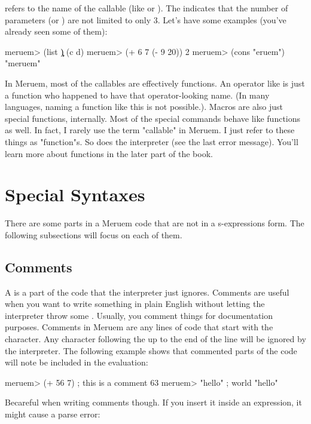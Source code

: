  refers to the name of the callable (like  or \code{++}). The  indicates that the number of parameters (or ) are not limited to only 3. Let's have some examples (you've already seen some of them):

\begin{REPL}
meruem> (list \c \d)
(c d)
meruem> (+ 6 7 (- 9 20))
2
meruem> (cons \m "eruem")
"meruem"
\end{REPL}

In Meruem, most of the callables are effectively functions. An operator like \code{+} is just a function who happened to have that operator-looking name. (In many languages, naming a function like this is not possible.). Macros are also just special functions, internally. Most of the special commands behave like functions as well. In fact, I rarely use the term "callable" in Meruem. I just refer to these things as "function"s. So does the interpreter (see the last error message). You'll learn more about functions in the later part of the book.

\section{Special Syntaxes}

There are some parts in a Meruem code that are not in a s-expressions form. The following subsections will focus on each of them.

\subsection{Comments}
A  is a part of the code that the interpreter just ignores. Comments are useful when you want to write something in plain English without letting the interpreter throw some . Usually, you comment things for documentation purposes. Comments in Meruem are any lines of code that start with the \code{;} character. Any character following the \code{;} up to the end of the line will be ignored by the interpreter. The following example shows that commented parts of the code will note be included in the evaluation:

\begin{REPL}
meruem> (+ 56 7) ; this is a comment
63
meruem> "hello" ; world
"hello"
\end{REPL}

Becareful when writing comments though. If you insert it inside an expression, it might cause a parse error:

